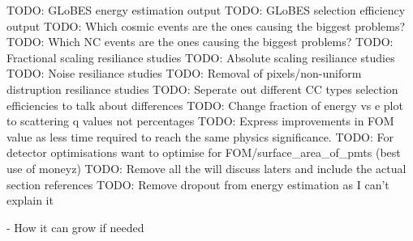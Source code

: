 TODO: GLoBES energy estimation output
TODO: GLoBES selection efficiency output
TODO: Which cosmic events are the ones causing the biggest problems?
TODO: Which NC events are the ones causing the biggest problems?
TODO: Fractional scaling resiliance studies
TODO: Absolute scaling resiliance studies
TODO: Noise resiliance studies
TODO: Removal of pixels/non-uniform distruption resiliance studies
TODO: Seperate out different CC types selection efficiencies to talk about differences
TODO: Change fraction of energy vs e plot to scattering q values not percentages
TODO: Express improvements in FOM value as less time required to reach the same physics significance.
TODO: For detector optimisations want to optimise for FOM/surface_area_of_pmts (best use of
moneyz)
TODO: Remove all the will discuss laters and include the actual section references
TODO: Remove dropout from energy estimation as I can't explain it

- How it can grow if needed